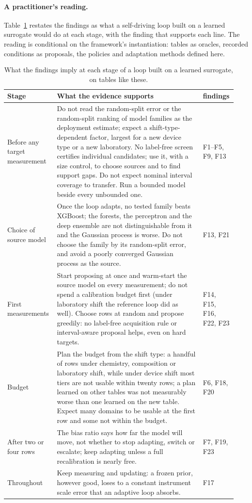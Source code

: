 \documentclass[11pt,a4paper]{article}
\begin{document}
\paragraph{A practitioner's reading.} Table~\ref{tab:loopguide} restates the
findings as what a self-driving loop built on a learned surrogate would do at
each stage, with the finding that supports each line. The reading is
conditional on the framework's instantiation: tables as oracles, recorded
conditions as proposals, the policies and adaptation methods defined here.

\begin{table}[htbp]
\centering\footnotesize
\caption{What the findings imply at each stage of a loop built on a learned
surrogate, on tables like these.}
\label{tab:loopguide}
\begin{tabular}{@{}p{0.2\linewidth}p{0.62\linewidth}p{0.12\linewidth}@{}}
\toprule
Stage & What the evidence supports & findings \\
\midrule
Before any target measurement & Do not read the random-split error or the random-split ranking of model families as the deployment estimate; expect a shift-type-dependent factor, largest for a new device type or a new laboratory. No label-free screen certifies individual candidates; use it, with a size control, to choose sources and to find support gaps. Do not expect nominal interval coverage to transfer. Run a bounded model beside every unbounded one. & F1--F5, F9, F13 \\
Choice of source model & Once the loop adapts, no tested family beats XGBoost; the forests, the perceptron and the deep ensemble are not distinguishable from it and the Gaussian process is worse. Do not choose the family by its random-split error, and avoid a poorly converged Gaussian process as the source. & F13, F21 \\
First measurements & Start proposing at once and warm-start the source model on every measurement; do not spend a calibration budget first (under laboratory shift the reference loop did as well). Choose rows at random and propose greedily: no label-free acquisition rule or interval-aware proposal helps, even on hard targets. & F14, F15, F16, F22, F23 \\
Budget & Plan the budget from the shift type: a handful of rows under chemistry, composition or laboratory shift, while under device shift most tiers are not usable within twenty rows; a plan learned on other tables was not measurably worse than one learned on the new table. Expect many domains to be usable at the first row and some not within the budget. & F6, F18, F20 \\
After two or four rows & The bias ratio says how far the model will move, not whether to stop adapting, switch or escalate; keep adapting unless a full recalibration is nearly free. & F7, F19, F23 \\
Throughout & Keep measuring and updating: a frozen prior, however good, loses to a constant instrument scale error that an adaptive loop absorbs. & F17 \\
\bottomrule
\end{tabular}
\end{table}
\end{document}
